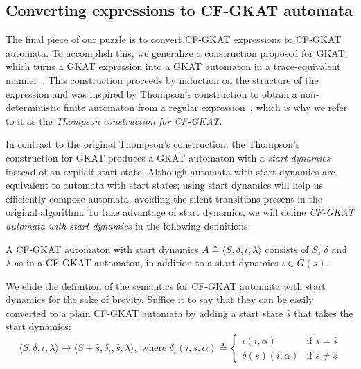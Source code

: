 \subsection{Converting expressions to CF-GKAT automata}

The final piece of our puzzle is to convert CF-GKAT expressions to CF-GKAT automata.
To accomplish this, we generalize a construction proposed for GKAT, which turns a GKAT expression into a GKAT automaton in a trace-equivalent manner~\cite{Schmid_Kappé_Kozen_Silva_2021}.
This construction proceeds by induction on the structure of the expression and was inspired by Thompson's construction to obtain a non-deterministic finite automaton from a regular expression~\cite{thompson_ProgrammingTechniquesRegular_1968}, which is why we refer to it as the \emph{Thompson construction for CF-GKAT}.

In contrast to the original Thompson's construction, the Thompson's construction for GKAT produces a GKAT automaton with a \emph{start dynamics} instead of an explicit start state. 
Although automata with start dynamics are equivalent to automata with start states; using start dynamics will help us efficiently compose automata, avoiding the silent transitions present in the original algorithm.
To take advantage of start dynamics, we will define \emph{CF-GKAT automata with start dynamics} in the following definitions:

\begin{definition}
 A CF-GKAT automaton with start dynamics \(A ≜ ⟨S, δ, ι, λ⟩\) consists of $S$, $δ$ and $λ$ as in a CF-GKAT automaton, in addition to a start dynamics \(ι ∈ G(s)\).
\end{definition}

We elide the definition of the semantics for CF-GKAT automata with start dynamics for the sake of brevity.
Suffice it to say that they can be easily converted to a plain CF-GKAT automata by adding a start state \(\hat{s}\) that takes the start dynamics:
\begin{equation}\label{cons: CF-GKAT pseudo start to CF-GKAT automata}
 ⟨S, δ, ι, λ⟩ ↦ ⟨S + \hat{s}, δ_ι, \hat{s}, λ⟩,
 \text{ where }
 δ_ι(i, s, α) ≜
 \begin{cases}
  ι(i, α)    & \text{if } s = \hat{s} \\
  δ(s)(i, α) & \text{if } s ≠ \hat{s}
 \end{cases}
\end{equation}


